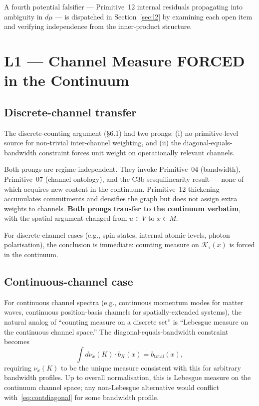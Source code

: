 \documentclass[11pt,a4paper]{article}
\begin{document}
A fourth potential falsifier --- Primitive~12 internal residuals propagating into ambiguity in $d\mu$ --- is dispatched in Section~\ref{sec:l2} by examining each open item and verifying independence from the inner-product structure.

\section{L1 --- Channel Measure FORCED in the Continuum}\label{sec:l1}

\subsection{Discrete-channel transfer}

The discrete-counting argument (\S 6.1) had two prongs: (i) no primitive-level source for non-trivial inter-channel weighting, and (ii) the diagonal-equals-bandwidth constraint forces unit weight on operationally relevant channels.

Both prongs are regime-independent. They invoke Primitive~04 (bandwidth), Primitive~07 (channel ontology), and the C3b sesquilinearity result --- none of which acquires new content in the continuum. Primitive~12 thickening accumulates commitments and densifies the graph but does not assign extra weights to channels. \textbf{Both prongs transfer to the continuum verbatim}, with the spatial argument changed from $u \in V$ to $x \in M$.

For discrete-channel cases (e.g., spin states, internal atomic levels, photon polarisation), the conclusion is immediate: counting measure on $\mathcal{K}_\tau(x)$ is forced in the continuum.

\subsection{Continuous-channel case}

For continuous channel spectra (e.g., continuous momentum modes for matter waves, continuous position-basis channels for spatially-extended systems), the natural analog of ``counting measure on a discrete set'' is ``Lebesgue measure on the continuous channel space.'' The diagonal-equals-bandwidth constraint becomes
\begin{equation}
\int d\nu_x(K) \cdot b_K(x) = b_\mathrm{total}(x),
\label{eq:contdiagonal}
\end{equation}
requiring $\nu_x(K)$ to be the unique measure consistent with this for arbitrary bandwidth profiles. Up to overall normalisation, this is Lebesgue measure on the continuum channel space; any non-Lebesgue alternative would conflict with~\eqref{eq:contdiagonal} for some bandwidth profile.
\end{document}
